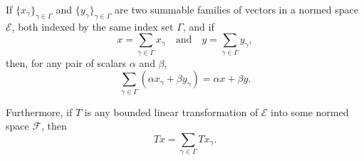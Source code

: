 If $\{x_{\gamma}\}_{\gamma \in \Gamma}$ and $\{y_{\gamma}\}_{\gamma \in \Gamma}$ are two summable families of vectors in a normed space $\mathcal{E}$, both indexed by the same index set $\Gamma$, and if
$$x = \sum_{\gamma \in \Gamma} x_{\gamma} \quad \text{and} \quad y = \sum_{\gamma \in \Gamma} y_{\gamma},$$
then, for any pair of scalars $\alpha$ and $\beta$,
$$\sum_{\gamma \in \Gamma} (\alpha x_{\gamma} + \beta y_{\gamma}) = \alpha x + \beta y.$$

Furthermore, if $T$ is any bounded linear transformation of $\mathcal{E}$ into some normed space $\mathcal{F}$, then
$$Tx = \sum_{\gamma \in \Gamma} T x_{\gamma}.$$
